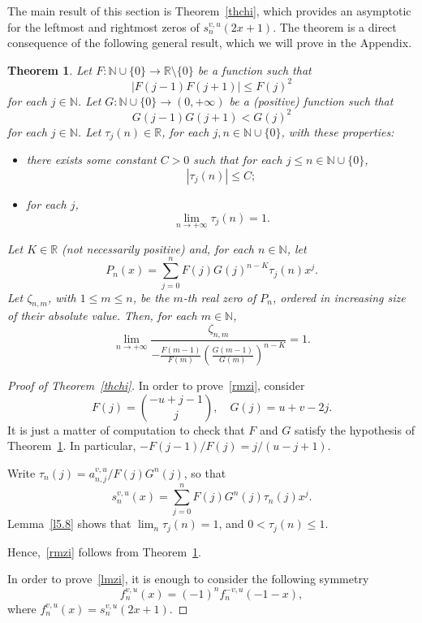 \documentclass[10pt, a4paper, leqno]{amsart}
\numberwithin{equation}{section}
\theoremstyle{plain}
\newtheorem{Theo}{Theorem}[section]
\theoremstyle{remark}
\newcommand{\RR}{\mathbb{R}}
\newcommand{\NN}{\mathbb{N}}
\begin{document}
The main result of this section is Theorem~\ref{thchi}, which provides an asymptotic for the leftmost and rightmost zeros of $s_n^{v,u}(2x+1)$.
The theorem is a direct consequence of the following general result, which we will prove in the Appendix.

\begin{Theo}
\label{sip}
Let $F : \NN \cup \{0\} \to \RR \setminus \{0\}$ be a function such that
\begin{equation}
\label{ht41}
  |F(j-1) F(j+1)| \le F(j)^2
\end{equation}
for each $j \in \NN$. Let $G : \NN \cup \{0\} \to (0,+\infty)$ be a (positive) function such that
\[
  G(j-1) G(j+1) < G(j)^2
\]
for each $j \in \NN$.  Let $\tau_j(n) \in \RR$, for each $j, n \in \NN \cup \{0\}$, with these properties:
\begin{itemize}
\item there exists some constant $C > 0$ such that for each $j \le n \in \NN \cup \{0\}$,
\begin{equation}
\label{tauacotado}
  |\tau_j(n)| \le C;
\end{equation}
\item for each $j$,
\[
  \lim_{n \to +\infty} \tau_j(n) = 1.
\]
\end{itemize}
Let $K \in \RR$ (not necessarily positive) and, for each $n \in \NN$, let
\[
  P_n(x) = \sum_{j=0}^n F(j) G(j)^{n-K} \tau_j(n) x^j.
\]
Let $\zeta_{n,m}$, with $1 \le m \le n$, be the $m$-th real zero of $P_n$, ordered in increasing size of their absolute value. Then, for each $m \in \NN$,
\[
  \lim_{n\to+\infty}
  \frac{\zeta_{n,m}}{
  -\frac{F(m-1)}{F(m)} \left(\frac{G(m-1)}{G(m)}\right)^{n-K}
  }
  = 1.
\]
\end{Theo}

\begin{proof}[Proof of Theorem~\ref{thchi}]
In order to prove~\eqref{rmzi}, consider
\[
  F(j) = \binom{-u+j-1}{j},\quad G(j)=u+v-2j.
\]
It is just a matter of computation to check that $F$ and $G$ satisfy the hypothesis of Theorem~\ref{sip}. In particular, $-F(j-1)/F(j)=j/(u-j+1)$.

Write $\tau_n(j)=a_{n,j}^{v,u}/F(j)G^n(j)$, so that
\[
  s_n^{v,u}(x)=\sum_{j=0}^nF(j)G^n(j)\tau_n(j)x^j.
\]
Lemma~\ref{l5.8} shows that $\lim_n\tau_j(n)=1$, and $0<\tau_j(n)\le 1$.

Hence,~\eqref{rmzi} follows from Theorem~\ref{sip}.

In order to prove~\eqref{lmzi}, it is enough to consider the following symmetry
\begin{equation}
\label{cosxb}
  f_n^{v,u}(x) = (-1)^nf_n^{-v,u}(-1-x),
\end{equation}
where $f_n^{v,u}(x) = s_n^{v,u}(2x+1)$.
\end{proof}
\end{document}
